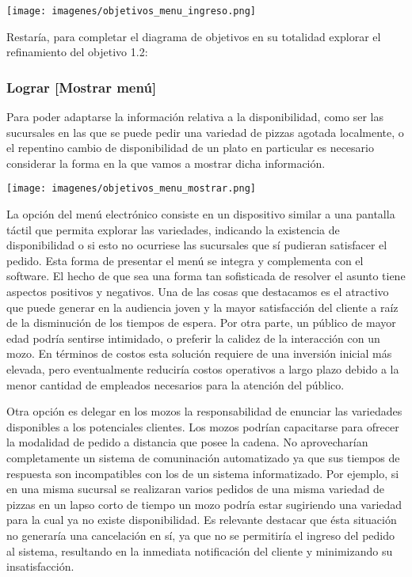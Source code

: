 \documentclass[a4paper,10pt]{article}
\begin{document}
\texttt{[image: imagenes/objetivos\_menu\_ingreso.png]}

Restaría, para completar el diagrama de objetivos en su totalidad explorar el refinamiento del objetivo 1.2:
\subsubsection*{Lograr [Mostrar menú]}
Para poder adaptarse la información relativa a la disponibilidad, como ser las sucursales en las que se puede pedir una variedad de pizzas agotada localmente, o el repentino cambio de disponibilidad de un plato en particular es necesario considerar la forma en la que vamos a mostrar dicha información.

\texttt{[image: imagenes/objetivos\_menu\_mostrar.png]}

La opción del menú electrónico consiste en un dispositivo similar a una pantalla táctil que permita explorar las variedades, indicando la existencia de disponibilidad o si esto no ocurriese las sucursales que sí pudieran satisfacer el pedido. Esta forma de presentar el menú se integra y complementa con el software. El hecho de que sea una forma tan sofisticada de resolver el asunto tiene aspectos positivos y negativos. Una de las cosas que destacamos es el atractivo que puede generar en la audiencia joven y la mayor satisfacción del cliente a raíz de la disminución de los tiempos de espera. 
Por otra parte, un público de mayor edad podría sentirse intimidado, o preferir la calidez de la interacción con un mozo. En términos de costos esta solución requiere de una inversión inicial más elevada, pero eventualmente reduciría costos operativos a largo plazo debido a la menor cantidad de empleados necesarios para la atención del público. 

Otra opción es delegar en los mozos la responsabilidad de enunciar las variedades disponibles a los potenciales clientes.
Los mozos podrían capacitarse para ofrecer la modalidad de pedido a distancia que posee la cadena. No aprovecharían completamente un sistema de comuninación automatizado ya que sus tiempos de respuesta son incompatibles con los de un sistema informatizado. Por ejemplo, si en una misma sucursal se realizaran varios pedidos de una misma variedad de pizzas en un lapso corto de tiempo un mozo podría estar sugiriendo una variedad para la cual ya no existe disponibilidad. Es relevante destacar que ésta situación no generaría una cancelación en sí, ya que no se permitiría el ingreso del pedido al sistema, resultando en la inmediata notificación del cliente y minimizando su insatisfacción.
\end{document}
